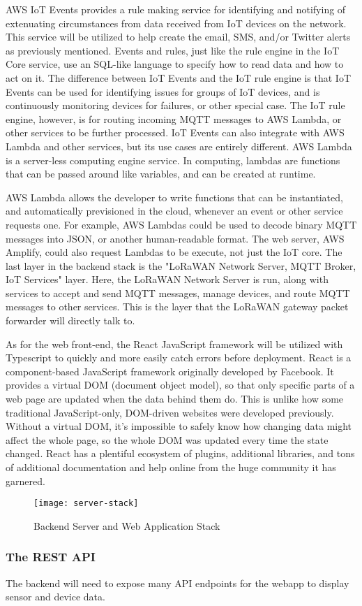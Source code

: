 AWS IoT Events provides a rule making service for identifying and notifying of extenuating
circumstances from data received from IoT devices on the network. This service will be utilized to
help create the email, SMS, and/or Twitter alerts as previously mentioned. Events and rules, just
like the rule engine in the IoT Core service, use an SQL-like language to specify how to read data
and how to act on it. The difference between IoT Events and the IoT rule engine is that IoT Events
can be used for identifying issues for groups of IoT devices, and is continuously monitoring devices
for failures, or other special case. The IoT rule engine, however, is for routing incoming MQTT
messages to AWS Lambda, or other services to be further processed. IoT Events can also integrate
with AWS Lambda and other services, but its use cases are entirely different. AWS Lambda is
a server-less computing engine service. In computing, lambdas are functions that can be passed
around like variables, and can be created at runtime.

AWS Lambda allows the developer to write functions that can be instantiated, and automatically
previsioned in the cloud, whenever an event or other service requests one. For example, AWS Lambdas
could be used to decode binary MQTT messages into JSON, or another human-readable format. The web
server, AWS Amplify, could also request Lambdas to be execute, not just the IoT core. The last layer
in the backend stack is the "LoRaWAN Network Server, MQTT Broker, IoT Services" layer. Here, the
LoRaWAN Network Server is run, along with services to accept and send MQTT messages, manage devices,
and route MQTT messages to other services. This is the layer that the LoRaWAN gateway packet
forwarder will directly talk to.

As for the web front-end, the React JavaScript framework will be utilized with Typescript to quickly
and more easily catch errors before deployment. React is a component-based JavaScript framework
originally developed by Facebook. It provides a virtual DOM (document object model), so that only
specific parts of a web page are updated when the data behind them do. This is unlike how some
traditional JavaScript-only, DOM-driven websites were developed previously. Without a virtual DOM,
it's impossible to safely know how changing data might affect the whole page, so the whole DOM was
updated every time the state changed. React has a plentiful ecosystem of plugins, additional
libraries, and tons of additional documentation and help online from the huge community it has
garnered.

\begin{figure}
  \centering
  \texttt{[image: server-stack]}
  \caption{Backend Server and Web Application Stack}
  \label{server-stack}
\end{figure}


\subsubsection{The REST API}
The backend will need to expose many API endpoints for the webapp to display sensor and device data.

